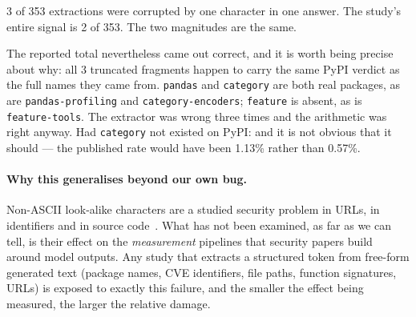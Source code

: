 \documentclass[journal]{IEEEtran}
\providecommand{\citep}[1]{\cite{#1}}
\theoremstyle{definition}
\newcommand{\Npkg}{353}
\newcommand{\Nhall}{2}
\newcommand{\Ntrunc}{3}
\newcommand{\Ncoin}{3}
\newcommand{\CFlo}{0.57}
\newcommand{\CFhi}{1.13}
\begin{document}
\Ntrunc{} of \Npkg{} extractions were corrupted by one character in one answer.
The study's entire signal is \Nhall{} of \Npkg{}. The two magnitudes are the
same.

The reported total nevertheless came out correct, and it is worth being precise
about why: all \Ncoin{} truncated fragments happen to carry the same PyPI
verdict as the full names they came from. \texttt{pandas} and
\texttt{category} are both real packages, as are \texttt{pandas-\allowbreak{}profiling} and
\texttt{category-\allowbreak{}encoders}; \texttt{feature} is absent, as is
\texttt{feature-tools}. The extractor was wrong three times and the arithmetic
was right anyway. Had \texttt{category} not existed on PyPI: and it is not
obvious that it should --- the published rate would have been \CFhi\% rather
than \CFlo\%.

\paragraph{Why this generalises beyond our own bug.}
Non-ASCII look-alike characters are a studied security problem in URLs, in
identifiers and in source code~\citep{gabrilovich2002homograph,
holgers2006homograph, boucher2022badchars, boucher2023trojansource,
unicode-tr36}. What has not been examined, as far as we can tell, is their
effect on the \emph{measurement} pipelines that security papers build around
model outputs. Any study that extracts a structured token from free-form
generated text (package names, CVE identifiers, file paths, function
signatures, URLs) is exposed to exactly this failure, and the smaller the
effect being measured, the larger the relative damage.
\end{document}
